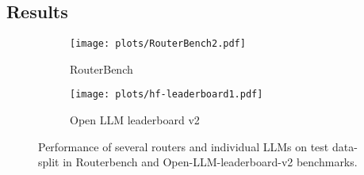 \subsection{Results} %




\begin{figure}
       \centering
       \begin{subfigure}[b]{0.45\textwidth}
           \centering
           \texttt{[image: plots/RouterBench2.pdf]} 
           \caption{RouterBench}
           \label{fig:RouterBench-main}
       \end{subfigure}
       \hspace{0.05\textwidth} %
       \begin{subfigure}[b]{0.45\textwidth}
           \centering
           \texttt{[image: plots/hf-leaderboard1.pdf]}
           \caption{Open LLM leaderboard v2}
           \label{fig:rexp_open_llm}
       \end{subfigure}
       \caption{Performance of several routers and individual LLMs on test data-split in Routerbench and Open-LLM-leaderboard-v2 benchmarks.}
       \label{fig:mainfig}
   \end{figure}

